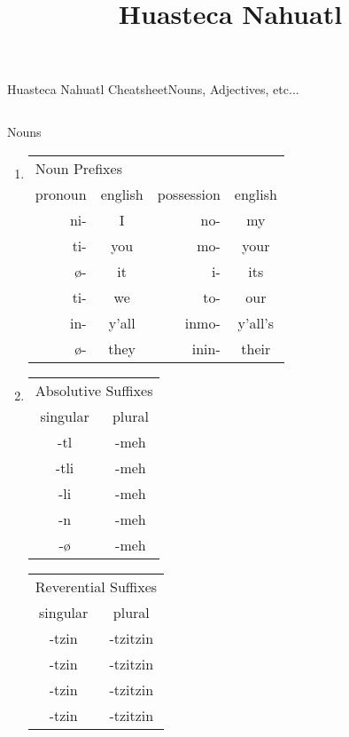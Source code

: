 \documentclass[12pt]{beamer}
\title{Huasteca Nahuatl}
\newcommand{\nah}[1]{\textcolor{nahgrn}{#1}}
\newcommand{\trs}[1]{\textcolor{nahblu}{#1}}
\begin{document}
\begin{frame}%
  {Huasteca Nahuatl Cheatsheet}{Nouns, Adjectives, etc...}
  \begin{columns}[t]
    \begin{column}{.23\linewidth}
      \begin{block}{Nouns}
        \begin{enumerate}
			\item \begin{tabular}[t]{r|c|r|c}
			  \multicolumn{4}{l}{Noun \nah{Prefixes}} \\
			  pronoun 	& english 	&possession & english	\\
			  \cline{1-4}
			  \nah{ni-} & I			&\nah{no-}	& my		\\
			  \nah{ti-} & you		&\nah{mo-} 	& your 		\\
			  \nah{ø-}  & it		&\nah{i-} 	& its		\\
			  \nah{ti-} & we		&\nah{to-}	& our		\\
			  \nah{in-} & y'all		&\nah{inmo-}& y'all's	\\
			  \nah{ø-}  & they		&\nah{inin-}& their		\\
			\end{tabular}%
			\item \begin{tabular}[t]{c|c}
				\multicolumn{2}{l}{Absolutive \trs{Suffixes}} \\
				singular    & plural             	\\
				\cline{1-2}
				\trs{-tl}   & \trs{-meh}         \\
				\trs{-tli}  & \trs{-meh}         \\
				\trs{-li}   & \trs{-meh}         \\
				\trs{-n}    & \trs{-meh}         \\
				\trs{-ø}    & \trs{-meh}       	 \\
			\end{tabular}%
			\begin{tabular}[t]{c|c}
				\multicolumn{2}{l}{Reverential \trs{Suffixes}} \\
				singular    & plural             	\\
				\cline{1-2}
				\trs{-tzin}   & \trs{-tzitzin}         \\
				\trs{-tzin}   & \trs{-tzitzin}         \\
				\trs{-tzin}   & \trs{-tzitzin}         \\
				\trs{-tzin}   & \trs{-tzitzin}         \\

\end{tabular}
\end{enumerate}
\end{block}
\end{column}
\end{columns}
\end{frame}
\end{document}
